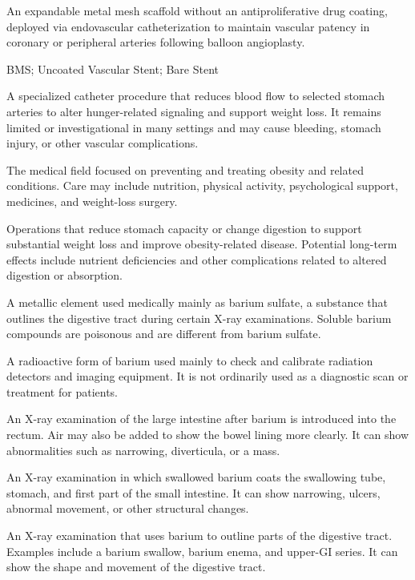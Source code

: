  An expandable metal mesh scaffold without an antiproliferative drug coating, deployed via endovascular catheterization to maintain vascular patency in coronary or peripheral arteries following balloon angioplasty.

\synonyms
BMS; Uncoated Vascular Stent; Bare Stent

 A specialized catheter procedure that reduces blood flow to selected stomach arteries to alter hunger-related signaling and support weight loss. It remains limited or investigational in many settings and may cause bleeding, stomach injury, or other vascular complications.

 The medical field focused on preventing and treating obesity and related conditions. Care may include nutrition, physical activity, psychological support, medicines, and weight-loss surgery.

 Operations that reduce stomach capacity or change
digestion to support substantial weight loss and improve obesity-related
disease. Potential long-term effects include nutrient deficiencies and other
complications related to altered digestion or absorption.

 A metallic element used medically mainly as barium sulfate, a substance that outlines the digestive tract during certain X-ray examinations. Soluble barium compounds are poisonous and are different from barium sulfate.

 A radioactive form of barium used mainly to check and calibrate radiation detectors and imaging equipment. It is not ordinarily used as a diagnostic scan or treatment for patients.

 An X-ray examination of the large intestine after barium is introduced into the rectum. Air may also be added to show the bowel lining more clearly. It can show abnormalities such as narrowing, diverticula, or a mass.

 An X-ray examination in which swallowed barium coats the swallowing tube, stomach, and first part of the small intestine. It can show narrowing, ulcers, abnormal movement, or other structural changes.

 An X-ray examination that uses barium to outline parts of the digestive tract. Examples include a barium swallow, barium enema, and upper-GI series. It can show the shape and movement of the digestive tract.

